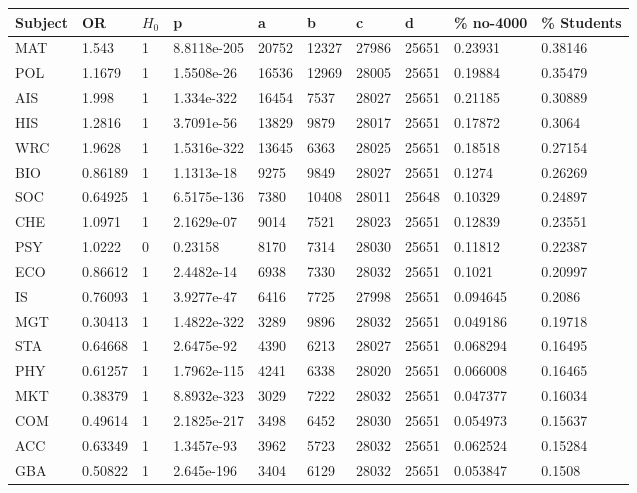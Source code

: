 {\scriptsize \ttfamily \begin{longtable}{llllllllll}\label{table:OR}
 \centering 
 \textbf{Subject} & \textbf{OR} & \textbf{$H_0$} & \textbf{p} & \textbf{a} & \textbf{b} & \textbf{c} & \textbf{d} & \% no-4000 & \% Students \\ 
\hline 
\color{red}MAT & 1.543 & 1 & \color{red}8.8118e-205 & 20752 & 12327 & 27986 & 25651 & 0.23931 & \color{red}0.38146 \\ 
\color{red}POL & 1.1679 & 1 & 1.5508e-26 & 16536 & 12969 & 28005 & 25651 & 0.19884 & 0.35479 \\ 
\color{red}AIS & 1.998 & 1 & \color{red}1.334e-322 & 16454 & 7537 & 28027 & 25651 & 0.21185 & \color{red}0.30889 \\ 
\color{red}HIS & 1.2816 & 1 & 3.7091e-56 & 13829 & 9879 & 28017 & 25651 & 0.17872 & 0.3064 \\ 
\color{red}WRC & 1.9628 & 1 & \color{red}1.5316e-322 & 13645 & 6363 & 28025 & 25651 & 0.18518 & \color{red}0.27154 \\ 
BIO & 0.86189 & 1 & 1.1313e-18 & 9275 & 9849 & 28027 & 25651 & 0.1274 & 0.26269 \\ 
SOC & 0.64925 & 1 & 6.5175e-136 & 7380 & 10408 & 28011 & 25648 & 0.10329 & 0.24897 \\ 
CHE & 1.0971 & 1 & 2.1629e-07 & 9014 & 7521 & 28023 & 25651 & 0.12839 & 0.23551 \\ 
PSY & 1.0222 & 0 & 0.23158 & 8170 & 7314 & 28030 & 25651 & 0.11812 & 0.22387 \\ 
ECO & 0.86612 & 1 & 2.4482e-14 & 6938 & 7330 & 28032 & 25651 & 0.1021 & 0.20997 \\ 
IS & 0.76093 & 1 & 3.9277e-47 & 6416 & 7725 & 27998 & 25651 & 0.094645 & 0.2086 \\ 
MGT & 0.30413 & 1 & 1.4822e-322 & 3289 & 9896 & 28032 & 25651 & 0.049186 & 0.19718 \\ 
STA & 0.64668 & 1 & 2.6475e-92 & 4390 & 6213 & 28027 & 25651 & 0.068294 & 0.16495 \\ 
PHY & 0.61257 & 1 & 1.7962e-115 & 4241 & 6338 & 28020 & 25651 & 0.066008 & 0.16465 \\ 
MKT & 0.38379 & 1 & 8.8932e-323 & 3029 & 7222 & 28032 & 25651 & 0.047377 & 0.16034 \\ 
COM & 0.49614 & 1 & 2.1825e-217 & 3498 & 6452 & 28030 & 25651 & 0.054973 & 0.15637 \\ 
ACC & 0.63349 & 1 & 1.3457e-93 & 3962 & 5723 & 28032 & 25651 & 0.062524 & 0.15284 \\ 
GBA & 0.50822 & 1 & 2.645e-196 & 3404 & 6129 & 28032 & 25651 & 0.053847 & 0.1508 \\ 

\end{longtable}}
